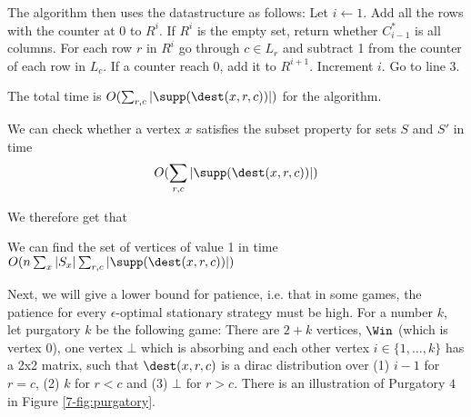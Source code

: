 The algorithm then uses the datastructure as follows:
Let $i\leftarrow 1$.
Add all the rows with the counter at 0 to $R^i$. 
If $R^i$ is the empty set, return whether $C_{i-1}^*$ is all columns.
For each row $r$ in $R^i$ go through $c\in L_r$ and subtract 1 from the counter of each row in $L_c$. If a counter reach 0, add it to $R^{i+1}$.
Increment $i$.
Go to line 3.

The total time is $O(\sum_{r,c}|\supp(\dest(x,r,c))|)$ for the algorithm.

\begin{lemma}
We can check whether a vertex $x$ satisfies the subset property for sets $S$ and $S'$ in time \[O(\sum_{r,c}|\supp(\dest(x,r,c))|)\]
\end{lemma}

We therefore get that \begin{lemma}\label{lem:val1}\label{lemm:find_1_reach}
We can find the set of vertices of value 1 in time $O(n\sum_{x} |S_x|\sum_{r,c}|\supp(\dest(x,r,c))|)$
\end{lemma}

Next, we will give a lower bound for patience, i.e. that in some games, the patience for every $\epsilon$-optimal stationary strategy must be high. 
For a number $k$, let purgatory $k$ be the following game:
There are $2+k$ vertices, $\Win$ (which is vertex 0), one vertex $\bot$ which is absorbing and each other vertex $i\in \{1,\dots, k\}$ has a 2x2 matrix, such that $\dest(x,r,c)$ is a dirac distribution over (1)
$i-1$ for $r=c$, (2) $k$ for $r<c$ and (3) $\bot$ for $r>c$.
There is an illustration of Purgatory $4$ in Figure \ref{7-fig:purgatory}. 

